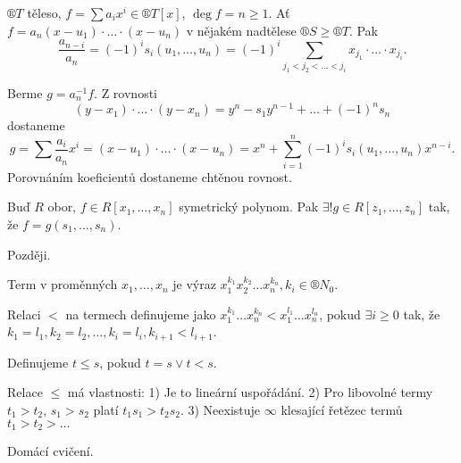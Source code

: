 \documentclass[12pt]{article}                   %
\begin{document}
    \begin{tvrzeni}
        $®T$ těleso, $f = \sum a_i x^i \in ®T[x]$, $\deg f = n ≥ 1$. Ať $f = a_n(x - u_1)·…·(x - u_n)$ v nějakém nadtělese $®S ≥ ®T$. Pak
        $$ \frac{a_{n-i}}{a_n} = (-1)^i s_i(u_1, …, u_n) = (-1)^i \sum_{j_1 < j_2 < … < j_i}x_{j_1}·…·x_{j_i}. $$

        \begin{dukazin}
            Berme $g = a^{-1}_n f$. Z rovnosti
            $$ (y - x_1)·…·(y - x_n) = y^n - s_1y^{n-1} + … + (-1)^ns_n $$
            dostaneme
            $$ g = \sum \frac{a_i}{a_n}x^i = (x - u_1)·…·(x - u_n) = x^n + \sum_{i=1}^n (-1)^i s_i(u_1, …, u_n)x^{n-i}. $$
            Porovnáním koeficientů dostaneme chtěnou rovnost.
        \end{dukazin}
    \end{tvrzeni}

    \begin{veta}
        Buď $R$ obor, $f \in R[x_1, …, x_n]$ symetrický polynom. Pak $\exists! g \in R[z_1, …, z_n]$ tak, že $f = g(s_1, …, s_n)$.

        \begin{dukazin}
            Později.
        \end{dukazin}
    \end{veta}

    \begin{definice}[Term]
        Term v proměnných $x_1, …, x_n$ je výraz $x_1^{k_1}x_2^{k_2}…x_n^{k_n}, k_i \in ®N_0$.
    \end{definice}

    \begin{definice}
        Relaci $<$ na termech definujeme jako $x_1^{k_1}…x_n^{k_n} < x_1^{l_1}…x_n^{l_n}$, pokud $\exists i ≥ 0$ tak, že $k_1 = l_1, k_2=l_2, …, k_i = l_i, k_{i + 1} < l_{i+1}$.

        Definujeme $t ≤ s$, pokud $t = s \lor t < s$.
    \end{definice}

    \begin{lemma}
        Relace $≤$ má vlastnosti: 1) Je to lineární uspořádání. 2) Pro libovolné termy $t_1 > t_2$, $s_1 > s_2$ platí $t_1s_1 > t_2s_2$. 3) Neexistuje $∞$ klesající řetězec termů $t_1 > t_2 > …$

        \begin{dukazin}
            Domácí cvičení.
        \end{dukazin}
    \end{lemma}
\end{document}
